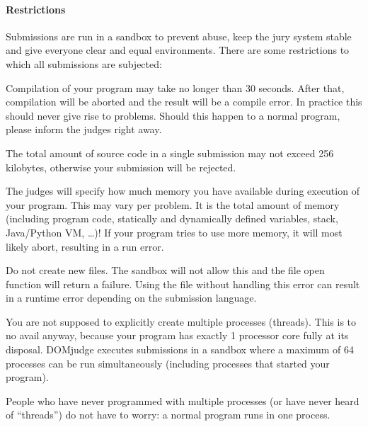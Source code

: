 \documentclass[a4paper,10pt,english,openany]{sphinxmanual}
\begin{document}
\paragraph{Restrictions}
\label{\detokenize{team:restrictions}}\label{\detokenize{team:runlimits}}
\sphinxAtStartPar
Submissions are run in a sandbox to prevent abuse, keep the jury system
stable and give everyone clear and equal environments. There
are some restrictions to which all submissions are subjected:
\begin{description}
\sphinxAtStartPar
Compilation of your program may take no longer than 30
seconds. After that, compilation will be aborted and the result will
be a compile error. In practice this should never give rise to
problems. Should this happen to a normal program, please inform the
judges right away.

\sphinxAtStartPar
The total amount of source code in a single submission may not exceed
256 kilobytes, otherwise your submission will be rejected.

\sphinxAtStartPar
The judges will specify how much memory you have available during
execution of your program. This may vary per problem. It is the
total amount of memory (including program code, statically and
dynamically defined variables, stack, Java/Python VM, …)!
If your program tries to use more memory, it will most likely abort,
resulting in a run error.

\sphinxAtStartPar
Do not create new files. The sandbox will not allow this and the file open
function will return a failure. Using the file without handling this error can
result in a runtime error depending on the submission language.

\sphinxAtStartPar
You are not supposed to explicitly create multiple processes (threads). This is
to no avail anyway, because your program has exactly 1 processor core fully
at its disposal. DOMjudge executes submissions in a sandbox where a maximum
of 64 processes can be run simultaneously (including processes that
started your program).

\sphinxAtStartPar
People who have never programmed with multiple processes (or have
never heard of “threads”) do not have to worry: a normal program
runs in one process.

\end{description}
\end{document}
